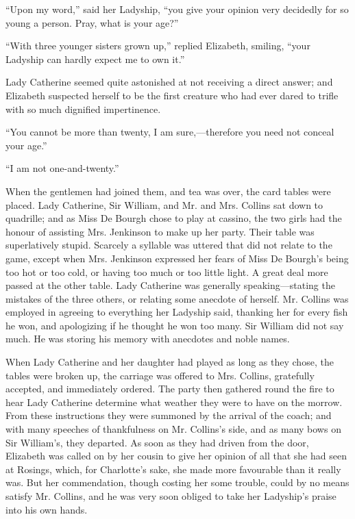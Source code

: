 ``Upon my word,'' said her Ladyship, ``you give your opinion very decidedly for so young a person. Pray, what is your age?''

``With three younger sisters grown up,'' replied Elizabeth, smiling, ``your Ladyship can hardly expect me to own it.''

Lady Catherine seemed quite astonished at not receiving a direct answer; and Elizabeth suspected herself to be the first creature who had ever dared to trifle with so much dignified impertinence.

``You cannot be more than twenty, I am sure,---therefore you need not conceal your age.''

``I am not one-and-twenty.''

When the gentlemen had joined them, and tea was over, the card tables were placed. Lady Catherine, Sir William, and Mr. and Mrs. Collins sat down to quadrille; and as Miss De Bourgh chose to play at cassino, the two girls had the honour of assisting Mrs. Jenkinson to make up her party. Their table was superlatively stupid. Scarcely a syllable was uttered that did not relate to the game, except when Mrs. Jenkinson expressed her fears of Miss De Bourgh's being too hot or too cold, or having too much or too little light. A great deal more passed at the other table. Lady Catherine was generally speaking---stating the mistakes of the three others, or relating some anecdote of herself. Mr. Collins was employed in agreeing to everything her Ladyship said, thanking her for every fish he won, and apologizing if he thought he won too many. Sir William did not say much. He was storing his memory with anecdotes and noble names.

When Lady Catherine and her daughter had played as long as they chose, the tables were broken up, the carriage was offered to Mrs. Collins, gratefully accepted, and immediately ordered. The party then gathered round the fire to hear Lady Catherine determine what weather they were to have on the morrow. From these instructions they were summoned by the arrival of the coach; and with many speeches of thankfulness on Mr. Collins's side, and as many bows on Sir William's, they departed. As soon as they had driven from the door, Elizabeth was called on by her cousin to give her opinion of all that she had seen at Rosings, which, for Charlotte's sake, she made more favourable than it really was. But her commendation, though costing her some trouble, could by no means satisfy Mr. Collins, and he was very soon obliged to take her Ladyship's praise into his own hands.


